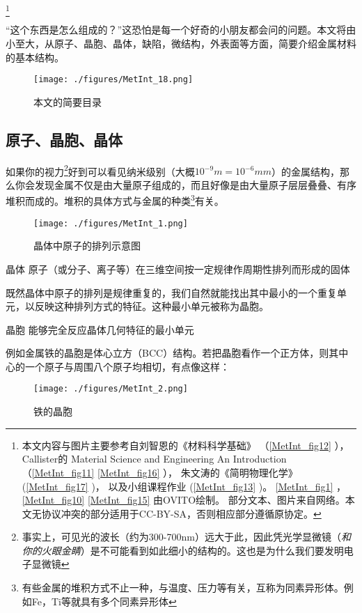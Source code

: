 
\footnote{本文内容与图片主要参考自刘智恩的《材料科学基础》
（\autoref{MetInt_fig12} ），
Callister的 Material Science and Engineering An Introduction
（\autoref{MetInt_fig11} \autoref{MetInt_fig16} ），
朱文涛的《简明物理化学》
(\autoref{MetInt_fig17} )，
以及小组课程作业
(\autoref{MetInt_fig13} )。 
\autoref{MetInt_fig1} ，\autoref{MetInt_fig10} \autoref{MetInt_fig15} 由OVITO绘制。
部分文本、图片来自网络。本文无协议冲突的部分适用于CC-BY-SA，否则相应部分遵循原协定。}

“这个东西是怎么组成的？”这恐怕是每一个好奇的小朋友都会问的问题。本文将由小至大，从原子、晶胞、晶体，缺陷，微结构，外表面等方面，简要介绍金属材料的基本结构。
\begin{figure}[ht]
\centering
\texttt{[image: ./figures/MetInt\_18.png]}
\caption{本文的简要目录} \label{MetInt_fig18}
\end{figure}

\subsection{原子、晶胞、晶体}
如果你的视力\footnote{事实上，可见光的波长（约为300-700nm）远大于此，因此凭光学显微镜（\textsl{和你的火眼金睛}）是不可能看到如此细小的结构的。这也是为什么我们要发明电子显微镜}好到可以看见纳米级别（大概$10^{-9}m =10^{-6} mm$）的金属结构，那么你会发现金属不仅是由大量原子组成的，而且好像是由大量原子层层叠叠、有序堆积而成的。堆积的具体方式与金属的种类\footnote{有些金属的堆积方式不止一种，与温度、压力等有关，互称为同素异形体。例如Fe，Ti等就具有多个同素异形体}有关。

\begin{figure}[ht]
\centering
\texttt{[image: ./figures/MetInt\_1.png]}
\caption{晶体中原子的排列示意图} \label{MetInt_fig1}
\end{figure}

\begin{definition}{晶体}
原子（或分子、离子等）在三维空间按一定规律作周期性排列而形成的固体
\end{definition}

既然晶体中原子的排列是规律重复的，我们自然就能找出其中最小的一个重复单元，以反映这种排列方式的特征。这种最小单元被称为晶胞。
\begin{definition}{晶胞}
能够完全反应晶体几何特征的最小单元
\end{definition}
例如金属铁的晶胞是体心立方（BCC）结构。若把晶胞看作一个正方体，则其中心的一个原子与周围八个原子均相切，有点像这样：
\begin{figure}[ht]
\centering
\texttt{[image: ./figures/MetInt\_2.png]}
\caption{铁的晶胞} \label{MetInt_fig2}
\end{figure}


